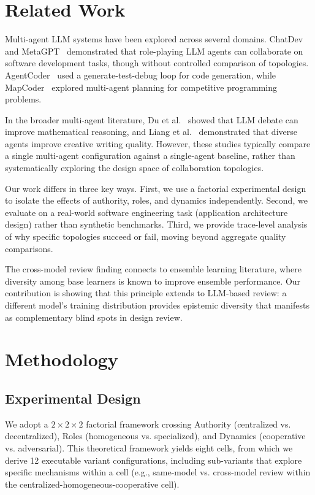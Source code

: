 \documentclass[conference]{IEEEtran}
\begin{document}
\section{Related Work}

Multi-agent LLM systems have been explored across several domains. ChatDev~\cite{chatdev} and MetaGPT~\cite{metagpt} demonstrated that role-playing LLM agents can collaborate on software development tasks, though without controlled comparison of topologies. AgentCoder~\cite{agentcoder} used a generate-test-debug loop for code generation, while MapCoder~\cite{mapcoder} explored multi-agent planning for competitive programming problems.

In the broader multi-agent literature, Du et al.~\cite{du} showed that LLM debate can improve mathematical reasoning, and Liang et al.~\cite{liang} demonstrated that diverse agents improve creative writing quality. However, these studies typically compare a single multi-agent configuration against a single-agent baseline, rather than systematically exploring the design space of collaboration topologies.

Our work differs in three key ways. First, we use a factorial experimental design to isolate the effects of authority, roles, and dynamics independently. Second, we evaluate on a real-world software engineering task (application architecture design) rather than synthetic benchmarks. Third, we provide trace-level analysis of why specific topologies succeed or fail, moving beyond aggregate quality comparisons.

The cross-model review finding connects to ensemble learning literature, where diversity among base learners is known to improve ensemble performance. Our contribution is showing that this principle extends to LLM-based review: a different model's training distribution provides epistemic diversity that manifests as complementary blind spots in design review.
\section{Methodology}

\subsection{Experimental Design}
We adopt a $2\times2\times2$ factorial framework crossing Authority (centralized vs. decentralized), Roles (homogeneous vs. specialized), and Dynamics (cooperative vs. adversarial). This theoretical framework yields eight cells, from which we derive 12 executable variant configurations, including sub-variants that explore specific mechanisms within a cell (e.g., same-model vs. cross-model review within the centralized-homogeneous-cooperative cell).
\end{document}
